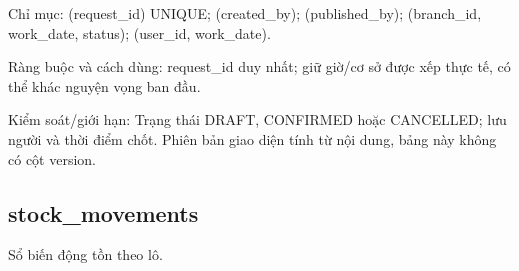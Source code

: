 Chỉ mục:\allowbreak{} (request\_\allowbreak{}id) UNIQUE; (created\_\allowbreak{}by); (published\_\allowbreak{}by); (branch\_\allowbreak{}id, work\_\allowbreak{}date, status); (user\_\allowbreak{}id, work\_\allowbreak{}date).\allowbreak{}

Ràng buộc và cách dùng:\allowbreak{} request\_\allowbreak{}id duy nhất; giữ giờ/\allowbreak{}cơ sở được xếp thực tế, có thể khác nguyện vọng ban đầu.\allowbreak{}

Kiểm soát/\allowbreak{}giới hạn:\allowbreak{} Trạng thái DRAFT, CONFIRMED hoặc CANCELLED; lưu người và thời điểm chốt.\allowbreak{} Phiên bản giao diện tính từ nội dung, bảng này không có cột version.\allowbreak{}

\clearpage

\subsection{stock\_\allowbreak{}movements}
Sổ biến động tồn theo lô.\allowbreak{}


